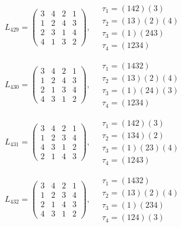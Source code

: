 $L_{429} = \begin{pmatrix} 3 & 4 & 2 & 1 \\ 1 & 2 & 4 & 3 \\ 2 & 3 & 1 & 4 \\ 4 & 1 & 3 & 2 \end{pmatrix}, \quad \begin{matrix} \tau_{1} = (1 4 2)(3) \\ \tau_{2} = (1 3)(2)(4) \\ \tau_{3} = (1)(2 4 3) \\ \tau_{4} = (1 2 3 4) \end{matrix}$

$L_{430} = \begin{pmatrix} 3 & 4 & 2 & 1 \\ 1 & 2 & 4 & 3 \\ 2 & 1 & 3 & 4 \\ 4 & 3 & 1 & 2 \end{pmatrix}, \quad \begin{matrix} \tau_{1} = (1 4 3 2) \\ \tau_{2} = (1 3)(2)(4) \\ \tau_{3} = (1)(2 4)(3) \\ \tau_{4} = (1 2 3 4) \end{matrix}$

$L_{431} = \begin{pmatrix} 3 & 4 & 2 & 1 \\ 1 & 2 & 3 & 4 \\ 4 & 3 & 1 & 2 \\ 2 & 1 & 4 & 3 \end{pmatrix}, \quad \begin{matrix} \tau_{1} = (1 4 2)(3) \\ \tau_{2} = (1 3 4)(2) \\ \tau_{3} = (1)(2 3)(4) \\ \tau_{4} = (1 2 4 3) \end{matrix}$

$L_{432} = \begin{pmatrix} 3 & 4 & 2 & 1 \\ 1 & 2 & 3 & 4 \\ 2 & 1 & 4 & 3 \\ 4 & 3 & 1 & 2 \end{pmatrix}, \quad \begin{matrix} \tau_{1} = (1 4 3 2) \\ \tau_{2} = (1 3)(2)(4) \\ \tau_{3} = (1)(2 3 4) \\ \tau_{4} = (1 2 4)(3) \end{matrix}$

